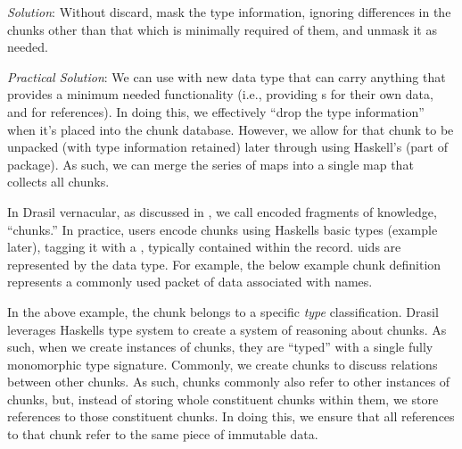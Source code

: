 \begin{writingdirectives}
      \item \textit{Solution}: Without discard, mask the type information,
            ignoring differences in the chunks other than that which is
            minimally required of them, and unmask it as needed.

      \item \textit{Practical Solution}: We can use \ExistentialQuantification{}
            with new data type that can carry anything that provides a minimum
            needed functionality (i.e., providing \UID{}s for their own data,
            and for references). In doing this, we effectively ``drop the type
            information'' when it's placed into the chunk database. However, we
            allow for that chunk to be unpacked (with type information retained)
            later through using Haskell's  (part of
             package). As such, we can merge the series of maps
            into a single map that collects all chunks.

\end{writingdirectives}

In Drasil vernacular, as discussed in , we call encoded
fragments of knowledge, ``chunks.'' In practice, users encode chunks using
Haskells basic  types (example later), tagging it with a
, typically contained within the record. \acsp{uid} are represented by
the \UID{} data type. For example,  the below example chunk definition represents a
commonly used packet of data associated with names.



In the above example, the chunk belongs to a specific \textit{type}
classification. Drasil
leverages Haskells type system to create a system of reasoning about chunks. As
such, when we create instances of chunks, they are ``typed'' with a single fully
monomorphic type signature. Commonly, we create chunks to discuss relations
between other chunks. As such, chunks commonly also refer to other instances of
chunks, but, instead of storing whole constituent chunks within them, we store
\UID{} references to those constituent chunks. In doing this, we ensure that all
references to that chunk refer to the same piece of immutable data.

